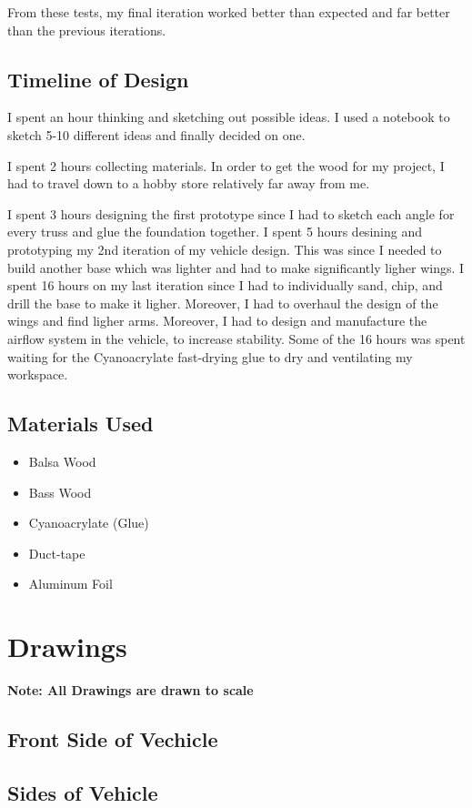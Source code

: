 \documentclass[12pt]{report}
\begin{document}
From these tests, my final iteration worked better than expected and far better than the previous iterations.


\section{Timeline of Design}
I spent an hour thinking and sketching out possible ideas. I used a notebook to sketch 5-10 different ideas and finally decided on one. 

I spent 2 hours collecting materials. In order to get the wood for my project, I had to travel down to a hobby store relatively far away from me.

I spent 3 hours designing the first prototype since I had to sketch each angle for every truss and glue the foundation together. I spent 5 hours desining and prototyping my 2nd iteration of my vehicle design. This was since I needed to build another base which was lighter and had to make significantly ligher wings. I spent 16 hours on my last iteration since I had to individually sand, chip, and drill the base to make it ligher. Moreover, I had to overhaul the design of the wings and find ligher arms. Moreover, I had to design and manufacture the airflow system in the vehicle, to increase stability. Some of the 16 hours was spent waiting for the Cyanoacrylate fast-drying glue to dry and ventilating my workspace.


\section{Materials Used}
\begin{itemize}
  \item Balsa Wood
  \item Bass Wood
  \item Cyanoacrylate (Glue)
  \item Duct-tape
  \item Aluminum Foil
\end{itemize}



\chapter{Drawings}
\textbf{Note: All Drawings are drawn to scale}
\section{Front Side of Vechicle}
\section{Sides of Vehicle}
\end{document}
